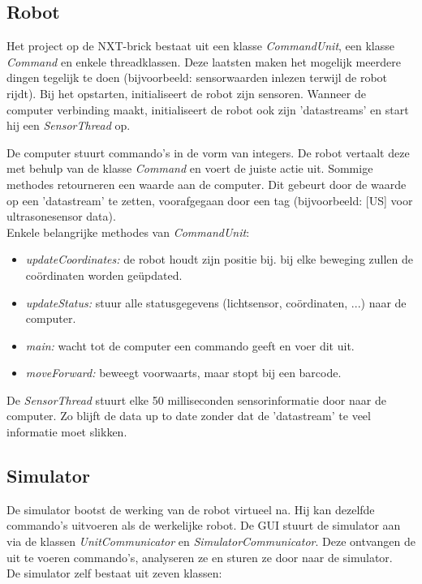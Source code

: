 \documentclass[tt3]{penoverslag}
\begin{document}
\subsection{Robot} %
\label{ssec:robot}
Het project op de NXT-brick bestaat uit een klasse \textit{CommandUnit}, een klasse \textit{Command} en enkele threadklassen. Deze laatsten maken het mogelijk meerdere dingen tegelijk te doen (bijvoorbeeld: sensorwaarden inlezen terwijl de robot rijdt). Bij het opstarten, initialiseert de robot zijn sensoren. Wanneer de computer verbinding maakt, initialiseert de robot ook zijn 'datastreams' en start hij een \textit{SensorThread} op.

De computer stuurt commando's in de vorm van integers. De robot vertaalt deze met behulp van de klasse \textit{Command} en voert de juiste actie uit. Sommige methodes retourneren een waarde aan de computer. Dit gebeurt door de waarde op een 'datastream' te zetten, voorafgegaan door een tag (bijvoorbeeld: [US] voor ultrasonesensor data).\\

Enkele belangrijke methodes van \textit{CommandUnit}:
\begin{itemize}
\item \textit{updateCoordinates:} de robot houdt zijn positie bij. bij elke beweging zullen de co\"ordinaten worden ge\"updated.
\item \textit{updateStatus:} stuur alle statusgegevens (lichtsensor, co\"ordinaten, ...) naar de computer.
\item \textit{main:} wacht tot de computer een commando geeft en voer dit uit.
\item \textit{moveForward:} beweegt voorwaarts, maar stopt bij een barcode.
\end{itemize}

De \textit{SensorThread} stuurt elke 50 milliseconden sensorinformatie door naar de computer. Zo blijft de data up to date zonder dat de 'datastream' te veel informatie moet slikken.

\subsection{Simulator} %
\label{ssec:simulator}
De simulator bootst de werking van de robot virtueel na. Hij kan dezelfde commando's uitvoeren als de werkelijke robot. De GUI stuurt de simulator aan via de klassen \textit{UnitCommunicator} en \textit{SimulatorCommunicator}. Deze ontvangen de uit te voeren commando's, analyseren ze en sturen ze door naar de simulator.
\\
De simulator zelf bestaat uit zeven klassen:
\end{document}
